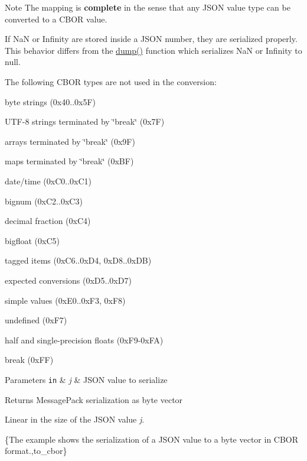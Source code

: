 \begin{DoxyNote}{Note}
The mapping is {\bfseries complete} in the sense that any J\+S\+ON value type can be converted to a C\+B\+OR value.

If NaN or Infinity are stored inside a J\+S\+ON number, they are serialized properly. This behavior differs from the \hyperlink{classnlohmann_1_1basic__json_a864a99beff1d81e760c9391688a857be}{dump()} function which serializes NaN or Infinity to {\ttfamily null}.

The following C\+B\+OR types are not used in the conversion\+:
\begin{DoxyItemize}
\item byte strings (0x40..0x5F)
\item U\+T\+F-\/8 strings terminated by \char`\"{}break\char`\"{} (0x7F)
\item arrays terminated by \char`\"{}break\char`\"{} (0x9F)
\item maps terminated by \char`\"{}break\char`\"{} (0x\+BF)
\item date/time (0x\+C0..0x\+C1)
\item bignum (0x\+C2..0x\+C3)
\item decimal fraction (0x\+C4)
\item bigfloat (0x\+C5)
\item tagged items (0x\+C6..0x\+D4, 0x\+D8..0x\+DB)
\item expected conversions (0x\+D5..0x\+D7)
\item simple values (0x\+E0..0x\+F3, 0x\+F8)
\item undefined (0x\+F7)
\item half and single-\/precision floats (0x\+F9-\/0x\+FA)
\item break (0x\+FF)
\end{DoxyItemize}
\end{DoxyNote}

\begin{DoxyParams}[1]{Parameters}
\mbox{\tt in}  & {\em j} & J\+S\+ON value to serialize \\
\hline
\end{DoxyParams}
\begin{DoxyReturn}{Returns}
Message\+Pack serialization as byte vector
\end{DoxyReturn}
Linear in the size of the J\+S\+ON value {\itshape j}.

\{The example shows the serialization of a J\+S\+ON value to a byte vector in C\+B\+OR format.,to\+\_\+cbor\}

